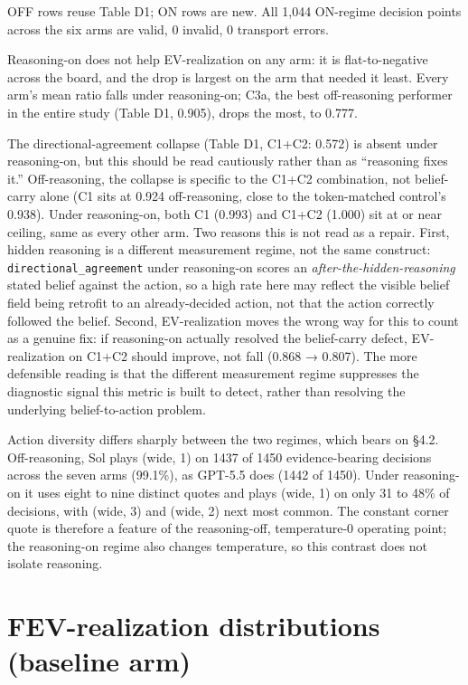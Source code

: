 \documentclass[
  10pt,
]{article}
\begin{document}
OFF rows reuse Table D1; ON rows are new. All 1,044 ON-regime decision points across the six arms are valid, 0 invalid, 0 transport errors.

Reasoning-on does not help EV-realization on any arm: it is flat-to-negative across the board, and the drop is largest on the arm that needed it least. Every arm's mean ratio falls under reasoning-on; C3a, the best off-reasoning performer in the entire study (Table D1, 0.905), drops the most, to 0.777.

The directional-agreement collapse (Table D1, C1+C2: 0.572) is absent under reasoning-on, but this should be read cautiously rather than as ``reasoning fixes it.'' Off-reasoning, the collapse is specific to the C1+C2 combination, not belief-carry alone (C1 sits at 0.924 off-reasoning, close to the token-matched control's 0.938). Under reasoning-on, both C1 (0.993) and C1+C2 (1.000) sit at or near ceiling, same as every other arm. Two reasons this is not read as a repair. First, hidden reasoning is a different measurement regime, not the same construct: \texttt{directional\_agreement} under reasoning-on scores an \emph{after-the-hidden-reasoning} stated belief against the action, so a high rate here may reflect the visible belief field being retrofit to an already-decided action, not that the action correctly followed the belief. Second, EV-realization moves the wrong way for this to count as a genuine fix: if reasoning-on actually resolved the belief-carry defect, EV-realization on C1+C2 should improve, not fall (0.868 → 0.807). The more defensible reading is that the different measurement regime suppresses the diagnostic signal this metric is built to detect, rather than resolving the underlying belief-to-action problem.

Action diversity differs sharply between the two regimes, which bears on §4.2. Off-reasoning, Sol plays (wide, 1) on 1437 of 1450 evidence-bearing decisions across the seven arms (99.1\%), as GPT-5.5 does (1442 of 1450). Under reasoning-on it uses eight to nine distinct quotes and plays (wide, 1) on only 31 to 48\% of decisions, with (wide, 3) and (wide, 2) next most common. The constant corner quote is therefore a feature of the reasoning-off, temperature-0 operating point; the reasoning-on regime also changes temperature, so this contrast does not isolate reasoning.

\section{F\quad EV-realization distributions (baseline arm)}\label{f-ev-realization-distributions-baseline-arm}
\end{document}
